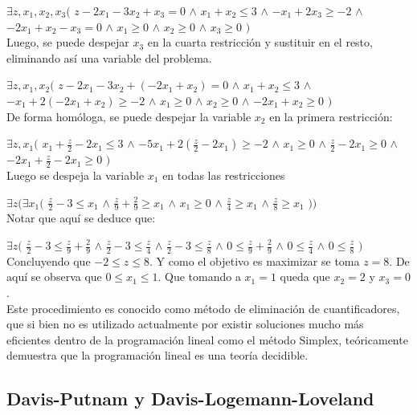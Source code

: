 \documentclass[12pt]{report}
\begin{document}
$\exists z,x_1,x_2,x_3 ($
$z - 2x_1 - 3x_2 + x_3 = 0$ $\land$
$ x_1 + x_2 \leq  3 $ $\land$
$ -x_1 + 2x_3 \geq  -2 $ $\land$
$ -2x_1 + x_2 - x_3 = 0 $ $\land$
$ x_1\geq  0 $ $\land$ 
$ x_2\geq  0 $ $\land$ 
$ x_3\geq  0 $ 
$)$\\

Luego, se puede despejar $x_3$ en la cuarta restricción y sustituir en el resto, eliminando así una variable del problema.

$\exists z,x_1,x_2($
$z - 2x_1 - 3x_2 + (-2x_1 + x_2) = 0$ $\land$
$ x_1 + x_2 \leq  3 $ $\land$
$ -x_1 + 2(-2x_1 + x_2) \geq  -2 $ $\land$
$ x_1\geq  0 $ $\land$ 
$ x_2\geq  0 $ $\land$ 
$ -2x_1 + x_2\geq  0 $ 
$)$\\

De forma homóloga, se puede despejar la variable $x_2$ en la primera restricción:

$\exists z,x_1 ($
$ x_1 + \frac z 2 -2x_1 \leq  3 $ $\land$
$ -5x_1 + 2(\frac z 2 -2x_1) \geq  -2 $ $\land$
$ x_1\geq  0 $ $\land$ 
$ \frac z 2 -2x_1 \geq  0 $ $\land$ 
$ -2x_1 + \frac z 2 -2x_1 \geq  0 $
$)$\\

Luego se despeja la variable $x_1$ en todas las restricciones

$\exists z (\exists x_1 ($
$ \frac z 2 - 3 \leq   x_1 $ $\land$
$ \frac z 9 + \frac 2 9 \geq  x_1 $ $\land$
$ x_1\geq  0 $ $\land$ 
$ \frac z 4 \geq  x_1 $ $\land$ 
$ \frac z 8 \geq  x_1 $ $))$\\

Notar que aquí se deduce que:

$\exists z ($
$ \frac z 2 - 3 \leq   \frac z 9 + \frac 2 9 $ $\land$
$ \frac z 2 - 3 \leq  \frac z 4  $ $\land$
$ \frac z 2 - 3 \leq  \frac z 8 $ $\land$
$ 0 \leq   \frac z 9 + \frac 2 9 $ $\land$
$ 0 \leq  \frac z 4  $ $\land$
$ 0 \leq  \frac z 8 $ 
$)$\\

Concluyendo que $-2\leq  z \leq  8$. Y como el objetivo es maximizar se toma $z=8$. De aquí se observa que $0\leq  x_1 \leq 1$. Que tomando a $x_1=1$ queda que $x_2=2$ y $x_3 = 0$.\\

Este procedimiento es conocido como método de eliminación de cuantificadores, que si bien no es utilizado actualmente por existir soluciones mucho más eficientes dentro de la programación lineal como el método Simplex, teóricamente demuestra que la programación lineal es una teoría decidible.\cite{Williams}

\subsection{Davis-Putnam y Davis-Logemann-Loveland}
\end{document}
